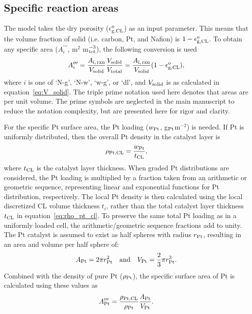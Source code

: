 \documentclass[final,3p,times,onecolumn]{elsarticle}    %
\begin{document}
\subsection{Specific reaction areas}
The model takes the dry porosity ($\epsilon_{\rm g,CL}^{\rm o}$) as an input parameter. This means that the volume fraction of solid (i.e. carbon, Pt, and Nafion) is $1 - \epsilon_{\rm g,CL}^{\rm o}$. To obtain any specific area ($A_{i}^{\prime\prime\prime}$, m$^2$ m$^{-3}_{\rm tot}$), the following conversion is used
\begin{equation} \label{eq:specific-rxn-areas}
    A_{i}^{\prime\prime\prime} 
    = \frac{A_{\rm i,\,rxn}}{V_{\rm solid}} \frac{V_{\rm solid}}{V_{\rm total}} 
    = \frac{A_{\rm i,\,rxn}}{V_{\rm solid}} (1 - \epsilon_{\rm g,CL}^{\rm o}),
\end{equation}
where $i$ is one of `N-g',  `N-w', `w-g', or `dl', and $V_{\rm solid}$ is as calculated in equation~\ref{eq:V_solid}. The triple prime notation used here denotes that areas are per unit volume. The prime symbols are neglected in the main manuscript to reduce the notation complexity, but are presented here for rigor and clarity. 

For the specific Pt surface area, the Pt loading ($w_{\rm Pt}$, g$_{\rm Pt}$m$^{-2}$) is needed. If  Pt is uniformly distributed, then the overall Pt density in the catalyst layer is
\begin{equation}\label{eq:rho_pt_cl}
    \rho_{\rm Pt, CL} = \frac{w_{\rm Pt}}{t_{\rm CL}},
\end{equation}
where $t_{\rm CL}$ is the catalyst layer thickness. When graded Pt distributions are considered, the Pt loading is multiplied by a fraction taken from an arithmetic or geometric sequence, representing linear and exponential functions for Pt distribution, respectively. The local Pt density is then calculated using the local discretized CL volume thickness $t_i$, rather than the total catalyst layer thickness $t_{\rm CL}$ in equation~\ref{eq:rho_pt_cl}. To preserve the same total Pt loading as in a uniformly loaded cell, the arithmetic/geometric sequence fractions add to unity. The Pt catalyst is assumed to exist as half spheres with radius $r_{\rm Pt}$, resulting in an area and volume per half sphere of:
\begin{equation}
    A_{\rm Pt} = 2 \pi r_{\rm Pt}^2 \quad \textrm{and} \quad V_{\rm Pt} = \frac{2}{3} \pi r_{\rm Pt}^3.
\end{equation}
Combined with the density of pure Pt ($\rho_{\rm Pt}$), the specific surface area of Pt is calculated using these values as
\begin{equation}
    A_{\rm Pt}^{\prime\prime\prime} 
    = \frac{\rho_{\rm Pt, CL}}{\rho_{\rm Pt}} \frac{A_{\rm Pt}}{V_{\rm Pt}}.
\end{equation}
\end{document}

